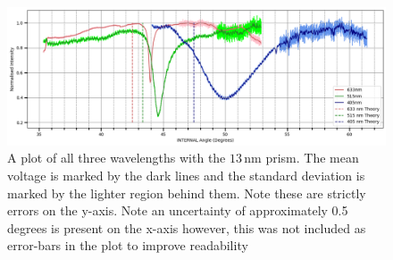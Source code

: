 \documentclass[%
reprint,
amsmath,amssymb,
aps,
]{revtex4-2}
\begin{document}
		
		\begin{figure}
			\includegraphics[width=1.6\columnwidth]{wavelengthDependence.png}
			\caption{\label{fig:wavelengthDependence}A plot of all three wavelengths with the $13\,\text{nm}$ prism. The mean voltage is marked by the dark lines and the standard deviation is marked by the lighter region behind them. Note these are strictly errors on the y-axis. Note an uncertainty of approximately 0.5 degrees is present on the x-axis however, this was not included as error-bars in the plot to improve readability}
		\end{figure}
\end{document}
